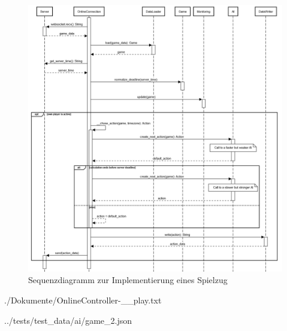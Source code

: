 \begin{figure}[htb]
	\centering
	\includegraphics[width=\textwidth]{Bilder/Sequenzdiagramm_Implementierung_Spielzug.png}
	\caption{Sequenzdiagramm zur Implementierung eines Spielzug}
	\label{fig:sequenzdiagramm-spielzug}
\end{figure}
\clearpage

\begin{minipage}{\textwidth}
	
	{./Dokumente/OnlineController-__play.txt}
\end{minipage}
\clearpage

\begin{minipage}{\textwidth}
	
	{../tests/test_data/ai/game_2.json}
\end{minipage}
\clearpage

